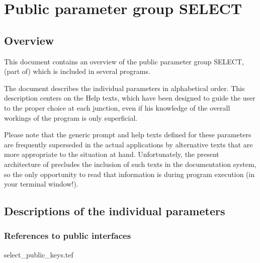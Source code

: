 
\chapter{ Public parameter group SELECT}
\tableofcontents


\section{ Overview}

	This document contains an overview of the public parameter group
SELECT, (part of) which is included in several \NEWSTAR programs.



	The
document describes the individual parameters in alphabetical order. This
description centers on the Help texts, which have been designed to guide the
user to the proper choice at each junction, even if his knowledge of the
overall workings of the program is only superficial.

	Please note that the generic prompt and help texts defined for these
parameters are frequently superseded in the actual applications by alternative
texts that are more appropriate to the situation at hand. Unfortunately, the
present architecture of \NEWSTAR precludes the inclusion of such texts in the
documentation system, so the only opportunity to read that information is
during program execution (in your terminal window!).


\section{ Descriptions of the individual parameters}
\label{.descriptions}

\subsection{ References to public interfaces}
\label{.public}

 {select_public_keys.tef}
